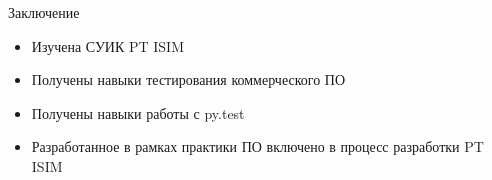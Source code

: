 \begin{frame}{Заключение}
    \begin{itemize}
        \item Изучена СУИК PT ISIM
        \item Получены навыки тестирования коммерческого ПО
        \item Получены навыки работы с py.test
        \item Разработанное в рамках практики ПО включено в процесс разработки PT ISIM
    \end{itemize}
\end{frame}